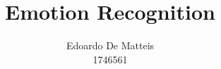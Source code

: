 \documentclass{article}
\title{Emotion Recognition}
\author{Edoardo De Matteis \\ 1746561}
\date{}
\begin{document}
    \maketitle

    \tableofcontents
    \clearpage

    
    
    
    
    

    {}
    
\end{document}
